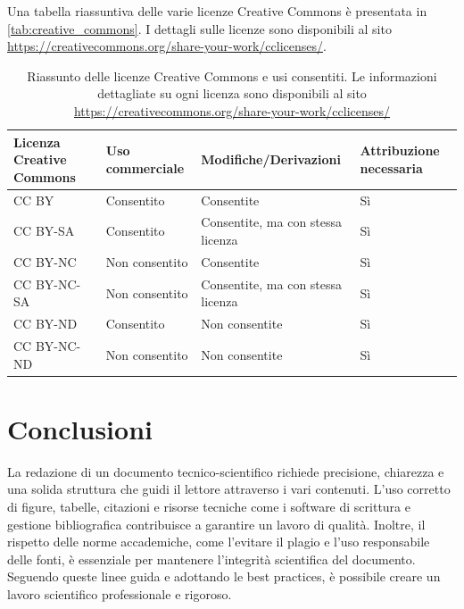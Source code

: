 \documentclass[9pt,a4paper,twoside]{rho-class/rho}
\begin{document}
Una tabella riassuntiva delle varie licenze Creative Commons è presentata in \autoref{tab:creative_commons}. I dettagli sulle licenze sono disponibili al sito \url{https://creativecommons.org/share-your-work/cclicenses/}.

\begin{table}[ht!]
\centering
\begin{tabular}{llll}
\hline
\textbf{Licenza Creative Commons} & \textbf{Uso commerciale} & \textbf{Modifiche/Derivazioni} & \textbf{Attribuzione necessaria} \\ \hline
CC BY                             & Consentito               & Consentite                      & Sì                              \\
CC BY-SA                          & Consentito               & Consentite, ma con stessa licenza & Sì                              \\
CC BY-NC                          & Non consentito           & Consentite                      & Sì                              \\ 
CC BY-NC-SA                       & Non consentito           & Consentite, ma con stessa licenza & Sì                              \\
CC BY-ND                          & Consentito               & Non consentite                  & Sì                              \\ 
CC BY-NC-ND                       & Non consentito           & Non consentite                  & Sì                              \\ \hline
\end{tabular}
\caption{Riassunto delle licenze Creative Commons e usi consentiti. Le informazioni dettagliate su ogni licenza sono disponibili al sito \url{https://creativecommons.org/share-your-work/cclicenses/}}
\label{tab:creative_commons}

\end{table}

\section{Conclusioni}

La redazione di un documento tecnico-scientifico richiede precisione, chiarezza e una solida struttura che guidi il lettore attraverso i vari contenuti. L’uso corretto di figure, tabelle, citazioni e risorse tecniche come i software di scrittura e gestione bibliografica contribuisce a garantire un lavoro di qualità. Inoltre, il rispetto delle norme accademiche, come l’evitare il plagio e l’uso responsabile delle fonti, è essenziale per mantenere l’integrità scientifica del documento. Seguendo queste linee guida e adottando le best practices, è possibile creare un lavoro scientifico professionale e rigoroso.
\end{document}
